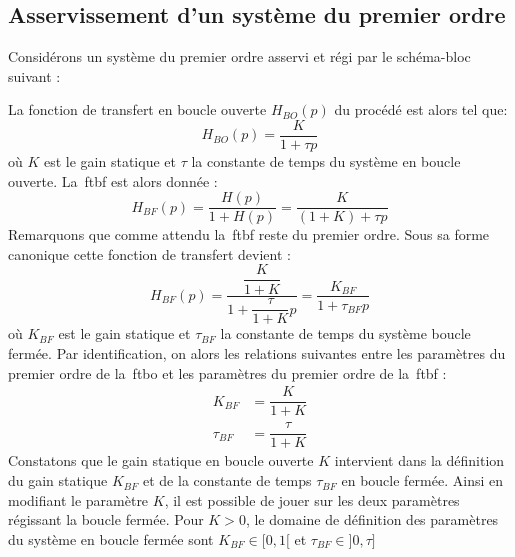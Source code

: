 \subsection{Asservissement d'un système du premier ordre}
Considérons un système du premier ordre asservi et régi par le schéma-bloc 
suivant :
\begin{center}
    
\end{center}
La fonction de transfert en boucle ouverte $H_{BO}(p)$ du procédé est alors 
tel que:
\[
H_{BO}(p)=\dfrac{K}{1+\tau p}
\]
où $K$ est le gain statique et $\tau$ la constante de temps 
du système en boucle ouverte. 
La~\gls{ftbf} est alors donnée :
\[
H_{BF}(p)=\dfrac{H(p)}{1+H(p)}=\dfrac{K}{(1+K)+\tau p}
\]
Remarquons que comme attendu la~\gls{ftbf} reste du premier ordre. 
Sous sa forme canonique cette fonction de transfert devient :
\[
H_{BF}(p)=\dfrac{\dfrac{K}{1+K}}{1+\dfrac{\tau}{1+K}p}
=\dfrac{K_{BF}}{1+\tau_{BF} p}
\]
où $K_{BF}$ est le gain statique et $\tau_{BF}$ la constante de temps du 
système boucle fermée. Par identification, on alors les relations suivantes 
entre les paramètres du premier ordre de la~\gls{ftbo} et les paramètres du 
premier ordre de la~\gls{ftbf} :
\begin{align*}
       K_{BF}&=\dfrac{K}{1+K}\\
    \tau_{BF}&=\dfrac{\tau}{1+K}
\end{align*}
Constatons que le gain statique en boucle ouverte $K$ intervient 
dans la définition du gain statique $K_{BF}$ et de la constante de temps 
$\tau_{BF}$ en boucle fermée. Ainsi en modifiant le paramètre $K$, il est 
possible de jouer sur les deux paramètres régissant la boucle fermée.
Pour $K>0$, le domaine de définition des paramètres du système en boucle 
fermée sont  $K_{BF}\in[0,1[$ et  $\tau_{BF}\in]0,\tau]$

